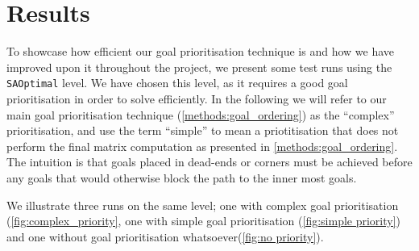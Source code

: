 \section{Results}
\label{sec:results}


To showcase how efficient our goal prioritisation technique is and how we have improved upon it throughout the project, we present some test runs using the \texttt{SAOptimal} level. 
We have chosen this level, as it requires a good goal prioritisation in order to solve efficiently.
In the following we will refer to our main goal prioritisation technique (\cref{methods:goal_ordering}) as the ``complex'' prioritisation, and use the term ``simple'' to mean a priotitisation that does not perform the final matrix computation as presented in \cref{methods:goal_ordering}.
The intuition is that goals placed in dead-ends or corners must be achieved before any goals that would otherwise block the path to the inner most goals.



We illustrate three runs on the same level; one with complex goal prioritisation (\cref{fig:complex_priority}, one with simple goal prioritisation (\cref{fig:simple priority}) and one without goal prioritisation whatsoever(\cref{fig:no priority}). 

